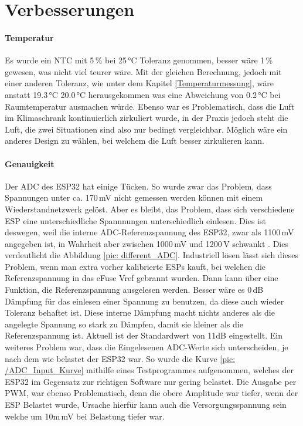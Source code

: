 \section{Verbesserungen} 
\label{Verbesserungen}

\paragraph{Temperatur}
Es wurde ein NTC mit 5\,\% bei 25\,°C Toleranz genommen, besser wäre 1\,\% gewesen, was nicht viel teurer wäre. Mit der gleichen Berechnung, jedoch mit einer anderen Toleranz, wie unter dem Kapitel \ref{Temperaturmessung}, wäre anstatt 19.3\,°C 20.0\,°C herausgekommen was eine Abweichung von 0.2\,°C bei Raumtemperatur ausmachen würde. Ebenso war es Problematisch, dass die Luft im Klimaschrank kontinuierlich zirkuliert wurde, in der Praxis jedoch steht die Luft, die zwei Situationen sind also nur bedingt vergleichbar. Möglich wäre ein anderes Design zu wählen, bei welchem die Luft besser zirkulieren kann.

\paragraph{Genauigkeit}
Der ADC des ESP32 hat einige Tücken. So wurde zwar das Problem, dass Spannungen unter ca. 170\,mV nicht gemessen werden können mit einem Wiederstandnetzwerk gelöst. Aber es bleibt, das Problem, dass sich verschiedene ESP eine unterschiedliche Spannnungen unterschiedlich einlesen. Dies ist deswegen, weil die interne ADC-Referenzspannung des ESP32, zwar als 1100\,mV angegeben ist, in Wahrheit aber zwischen 1000\,mV und 1200\,V schwankt \cite{noauthor_analog_nodate}. Dies verdeutlicht die Abbildung \ref{pic: different_ADC}. Industriell lösen lässt sich dieses Problem, wenn man extra vorher kalibrierte ESPs kauft, bei welchen die Referenzspannung in das eFuse Vref gebrannt wurden. Dann kann über eine Funktion, die Referenzspannung ausgelesen werden. Besser wäre es 0\,dB Dämpfung für das einlesen einer Spannung zu benutzen, da diese auch wieder Toleranz behaftet ist. Diese interne Dämpfung macht nichts anderes als die angelegte  Spannung so stark zu Dämpfen, damit sie kleiner als die Referenzspannung ist. Aktuell ist der Standardwert von 11dB eingestellt. Ein weiteres Problem war, dass die Eingelesenen ADC-Werte sich unterscheiden, je nach dem wie belastet der ESP32 war. So wurde die Kurve \ref{pic: /ADC_Input_Kurve} mithilfe eines Testprogrammes aufgenommen, welches der ESP32 im Gegensatz zur richtigen Software nur gering belastet. Die Ausgabe per PWM, war ebenso Problematisch, denn die obere Amplitude war tiefer, wenn der ESP Belastet wurde, Ursache hierfür kann auch die Versorgungsspannung sein welche um 10m\,mV bei Belastung tiefer war.

